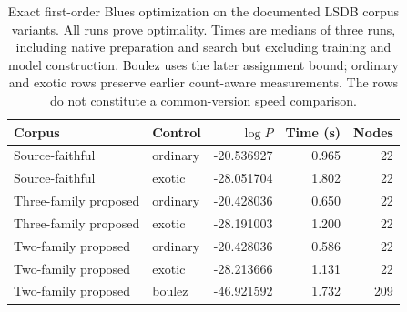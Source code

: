 \begin{table}[htbp]
\centering
\small
\begin{tabular}{llrrr}
\hline
Corpus & Control & $\log P$ & Time (s) & Nodes \\
\hline
Source-faithful & ordinary & -20.536927 & 0.965 & 22 \\
Source-faithful & exotic & -28.051704 & 1.802 & 22 \\
Three-family proposed & ordinary & -20.428036 & 0.650 & 22 \\
Three-family proposed & exotic & -28.191003 & 1.200 & 22 \\
Two-family proposed & ordinary & -20.428036 & 0.586 & 22 \\
Two-family proposed & exotic & -28.213666 & 1.131 & 22 \\
Two-family proposed & boulez & -46.921592 & 1.732 & 209 \\
\hline
\end{tabular}
\caption{Exact first-order Blues optimization on the documented LSDB corpus variants. All runs prove optimality. Times are medians of three runs, including native preparation and search but excluding training and model construction. Boulez uses the later assignment bound; ordinary and exotic rows preserve earlier count-aware measurements. The rows do not constitute a common-version speed comparison.}
\label{tab:snarky-blues-results}
\end{table}
